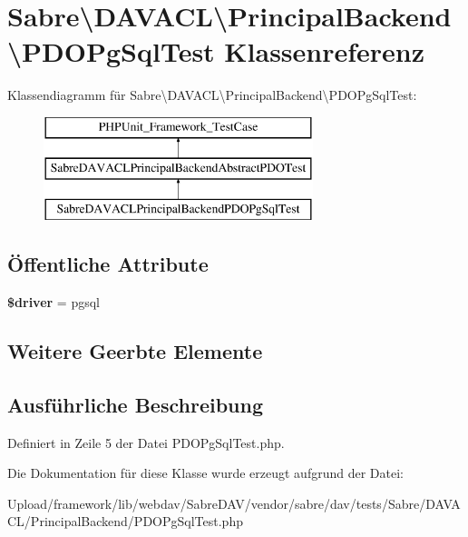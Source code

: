 \hypertarget{class_sabre_1_1_d_a_v_a_c_l_1_1_principal_backend_1_1_p_d_o_pg_sql_test}{}\section{Sabre\textbackslash{}D\+A\+V\+A\+CL\textbackslash{}Principal\+Backend\textbackslash{}P\+D\+O\+Pg\+Sql\+Test Klassenreferenz}
\label{class_sabre_1_1_d_a_v_a_c_l_1_1_principal_backend_1_1_p_d_o_pg_sql_test}
Klassendiagramm für Sabre\textbackslash{}D\+A\+V\+A\+CL\textbackslash{}Principal\+Backend\textbackslash{}P\+D\+O\+Pg\+Sql\+Test\+:\begin{figure}[H]
\begin{center}
\leavevmode
\includegraphics[height=3.000000cm]{class_sabre_1_1_d_a_v_a_c_l_1_1_principal_backend_1_1_p_d_o_pg_sql_test}
\end{center}
\end{figure}
\subsection*{Öffentliche Attribute}
\begin{DoxyCompactItemize}
\item 
\mbox{\label{class_sabre_1_1_d_a_v_a_c_l_1_1_principal_backend_1_1_p_d_o_pg_sql_test_a1727c23b6504d5ed92cf7d09abccb1c6}} 
{\bfseries \$driver} = \textquotesingle{}pgsql\textquotesingle{}
\end{DoxyCompactItemize}
\subsection*{Weitere Geerbte Elemente}


\subsection{Ausführliche Beschreibung}


Definiert in Zeile 5 der Datei P\+D\+O\+Pg\+Sql\+Test.\+php.



Die Dokumentation für diese Klasse wurde erzeugt aufgrund der Datei\+:\begin{DoxyCompactItemize}
\item 
Upload/framework/lib/webdav/\+Sabre\+D\+A\+V/vendor/sabre/dav/tests/\+Sabre/\+D\+A\+V\+A\+C\+L/\+Principal\+Backend/P\+D\+O\+Pg\+Sql\+Test.\+php\end{DoxyCompactItemize}

